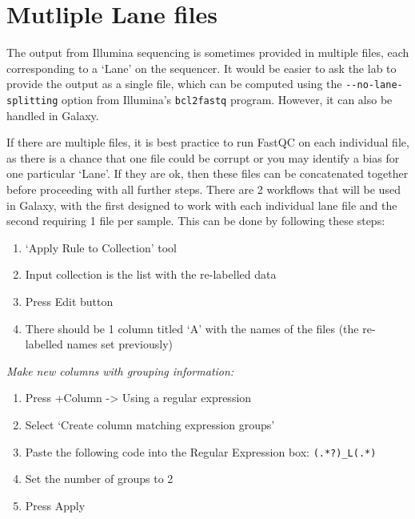 \documentclass[
]{book}
\providecommand{\tightlist}{%
  \setlength{\itemsep}{0pt}\setlength{\parskip}{0pt}}
\begin{document}
\hypertarget{multiple-lane-files}{%
\chapter{Mutliple Lane files}\label{multiple-lane-files}}

The output from Illumina sequencing is sometimes provided in multiple files, each corresponding to a `Lane' on the sequencer. It would be easier to ask the lab to provide the output as a single file, which can be computed using the \texttt{-\/-no-lane-splitting} option from Illumina's \texttt{bcl2fastq} program. However, it can also be handled in Galaxy.

If there are multiple files, it is best practice to run FastQC on each individual file, as there is a chance that one file could be corrupt or you may identify a bias for one particular `Lane'. If they are ok, then these files can be concatenated together before proceeding with all further steps. There are 2 workflows that will be used in Galaxy, with the first designed to work with each individual lane file and the second requiring 1 file per sample. This can be done by following these steps:

\begin{enumerate}
\def\labelenumi{\arabic{enumi}.}
\tightlist
\item
  `Apply Rule to Collection' tool
\item
  Input collection is the list with the re-labelled data
\item
  Press Edit button
\item
  There should be 1 column titled `A' with the names of the files (the re-labelled names set previously)
\end{enumerate}

\emph{Make new columns with grouping information:}

\begin{enumerate}
\def\labelenumi{\arabic{enumi}.}
\setcounter{enumi}{4}
\tightlist
\item
  Press +Column -\textgreater{} Using a regular expression
\item
  Select `Create column matching expression groups'
\item
  Paste the following code into the Regular Expression box: \texttt{(.*?)\_L(.*)}
\item
  Set the number of groups to 2
\item
  Press Apply
\end{enumerate}
\end{document}
